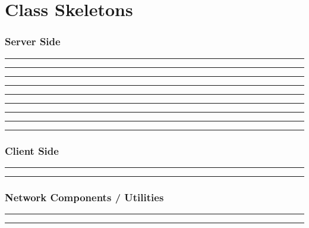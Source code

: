 \part{Class Skeletons}


\section{Server Side}


\hrule

\hrule

\hrule

\hrule

\hrule

\hrule

\hrule

\hrule

\hrule


\section{Client Side}


\hrule

\hrule



\section{Network Components / Utilities}


\hrule

\hrule
